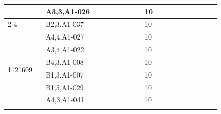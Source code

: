\documentclass[UTF8,10pt,a4paper,fontset=fandol]{ctexart}
\newcommand{\fieldvalue}[1]{#1}
\newcommand{\handwritten}[1]{#1}
\begin{document}
\begin{tabular}{|p{0.15\linewidth}|p{0.39\linewidth}|p{0.18\linewidth}|p{0.12\linewidth}|}
&
\fieldvalue{\handwritten{A3,3,A1-026}}
&
\fieldvalue{\handwritten{10}} & \\ \cline{2-4}

&
\fieldvalue{\handwritten{B2,3,A1-037}}
&
\fieldvalue{\handwritten{10}} & \\ \hline

\multirow{9}{*}{\fieldvalue{\handwritten{1121609}}}
&
\fieldvalue{\handwritten{A4,4,A1-027}}
&
\fieldvalue{\handwritten{10}} & \\ \cline{2-4}

&
\fieldvalue{\handwritten{A3,4,A1-022}}
&
\fieldvalue{\handwritten{10}} & \\ \cline{2-4}

&
\fieldvalue{\handwritten{B4,3,A1-008}}
&
\fieldvalue{\handwritten{10}} & \\ \cline{2-4}

&
\fieldvalue{\handwritten{B1,3,A1-007}}
&
\fieldvalue{\handwritten{10}} & \\ \cline{2-4}

&
\fieldvalue{\handwritten{B1,5,A1-029}}
&
\fieldvalue{\handwritten{10}} & \\ \cline{2-4}

&
\fieldvalue{\handwritten{A4,3,A1-041}}
&
\fieldvalue{\handwritten{10}} & \\ \cline{2-4}


\end{tabular}
\end{document}
